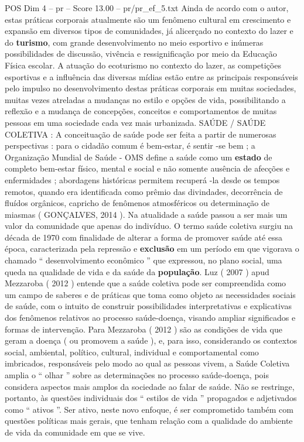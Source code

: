 \begin{textsample}{POS Dim 4 – pr – Score 13.00 – pr/pr\_ef\_5.txt}
Ainda de acordo com o autor, estas práticas corporais atualmente são um fenômeno cultural em crescimento e expansão em diversos tipos de comunidades, já alicerçado no contexto do lazer e do \textbf{turismo}, com grande desenvolvimento no meio esportivo e inúmeras possibilidades de discussão, vivência e ressignificação por meio da Educação Física escolar.
A atuação do ecoturismo no contexto do lazer, as competições esportivas e a influência das diversas mídias estão entre as principais responsáveis pelo impulso no desenvolvimento destas práticas corporais em muitas sociedades, muitas vezes atreladas a mudanças no estilo e opções de vida, possibilitando a reflexão e a mudança de concepções, conceitos e comportamentos de muitas pessoas em uma sociedade cada vez mais urbanizada.
SAÚDE / SAÚDE COLETIVA : A conceituação de saúde pode ser feita a partir de numerosas perspectivas : para o cidadão comum é bem-estar, é sentir -se bem ; a Organização Mundial de Saúde - OMS define a saúde como um \textbf{estado} de completo bem-estar físico, mental e social e não somente ausência de afecções e enfermidades ; abordagens históricas permitem recuperá -la desde os tempos remotos, quando era identificada como prêmio das divindades, decorrência de fluídos orgânicos, capricho de fenômenos atmosféricos ou determinação de miasmas ( GONÇALVES, 2014 ).
Na atualidade a saúde passou a ser mais um valor da comunidade que apenas do indivíduo.
O termo saúde coletiva surgiu na década de 1970 com finalidade de alterar a forma de promover saúde até essa época, caracterizada pela repressão e \textbf{exclusão} em um período em que vigorava o chamado “ desenvolvimento econômico ” que expressou, no plano social, uma queda na qualidade de vida e da saúde da \textbf{população}.
Luz ( 2007 ) apud Mezzaroba ( 2012 ) entende que a saúde coletiva pode ser compreendida como um campo de saberes e de práticas que toma como objeto as necessidades sociais de saúde, com o intuito de construir possibilidades interpretativas e explicativas dos fenômenos relativos ao processo saúde-doença, visando ampliar significados e formas de intervenção.
Para Mezzaroba ( 2012 ) são as condições de vida que geram a doença ( ou promovem a saúde ), e, para isso, considerando os contextos social, ambiental, político, cultural, individual e comportamental como imbricados, responsáveis pelo modo ao qual as pessoas vivem, a Saúde Coletiva amplia o “ olhar ” sobre as determinações no processo saúde-doença, pois considera aspectos mais amplos da sociedade ao falar de saúde.
Não se restringe, portanto, às questões individuais dos “ estilos de vida ” propagados e adjetivados como “ ativos ”.
Ser ativo, neste novo enfoque, é ser comprometido também com questões políticas mais gerais, que tenham relação com a qualidade do ambiente de vida da comunidade em que se vive.

\end{textsample}
